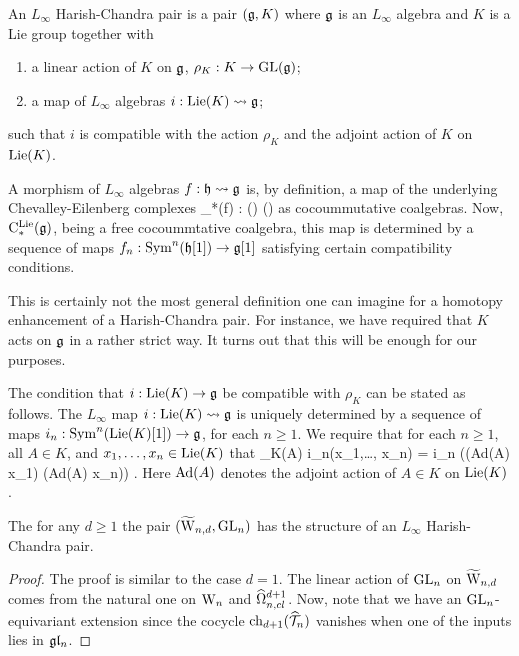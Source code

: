 \begin{dfn} An $L_\infty$ Harish-Chandra pair is a pair $(\mathfrak g,K)$ where $\mathfrak g$ is an $L_\infty$ algebra and $K$ is a Lie group together with
\begin{enumerate}
\item a linear action of $K$ on $\mathfrak g$, $\rho_K : K \to {\rm GL}(\mathfrak g)$;
\item a map of $L_\infty$ algebras $i : {\rm Lie}(K) \rightsquigarrow \mathfrak g$;
\end{enumerate}
such that $i$ is compatible with the action $\rho_K$ and the adjoint action of $K$ on ${\rm Lie}(K)$.
\end{dfn}

\begin{rmk}
A morphism of $L_\infty$ algebras $f : \mathfrak h \rightsquigarrow \mathfrak g$ is, by definition, a map of the underlying Chevalley-Eilenberg complexes
\ben
\clieu_*(f) : \clieu(\fh) \to \clieu(\fg)
\een 
as cocoummutative coalgebras. 
Now, ${\rm C}^{\rm Lie}_*(\mathfrak g)$, being a free cocoummtative coalgebra, this map is determined by a sequence of maps $f_n : {\rm Sym}^n(\mathfrak h[1]) \to \mathfrak g[1]$ satisfying certain compatibility conditions. 
\end{rmk}

\begin{rmk} 
This is certainly not the most general definition one can imagine for a homotopy enhancement of a Harish-Chandra pair. 
For instance, we have required that $K$ acts on $\mathfrak g$ in a rather strict way. 
It turns out that this will be enough for our purposes.
\end{rmk}

The condition that $i : {\rm Lie}(K) \to \mathfrak g$ be compatible with $\rho_K$ can be stated as follows. 
The $L_\infty$ map $i : {\rm Lie}(K) \rightsquigarrow \mathfrak g$ is uniquely determined by a sequence of maps $i_n : {\rm Sym}^n({\rm Lie}(K)[1]) \to \mathfrak g$, for each $n \geq 1$. 
We require that for each $n \geq 1$, all $A \in K$, and $x_1,\ldots, x_n \in {\rm Lie}(K)$ that
\ben
\rho_K(A) \cdot i_n(x_1,\ldots, x_n) = i_n \left(\left({\rm Ad}(A) \cdot x_{1}\right) \cdots  \left({\rm Ad}(A) \cdot x_{n}\right)\right) .
\een 
Here ${\rm Ad}(A)$ denotes the adjoint action of $A \in K$ on ${\rm Lie}(K)$. 

\begin{lem} The for any $d \geq 1$ the pair $(\widetilde{\rm W}_{n,d}, {\rm GL}_n)$ has the structure of an $L_\infty$ Harish-Chandra pair.
\end{lem}
\begin{proof}
The proof is similar to the case $d=1$. 
The linear action of ${\rm GL}_n$ on $\widetilde{\rm W}_{n,d}$ comes from the natural one on ${{\rm W}_n}$ and $\widehat{\Omega}^{d+1}_{n,cl}$. 
Now, note that we have an ${\rm GL}_n$-equivariant extension
\ben
{}
\een
since the cocycle ${\rm ch}_{d+1}(\widehat{\mathcal T}_n)$ vanishes when one of the inputs lies in $\mathfrak{g} \mathfrak{l}_n$. 
\end{proof}


